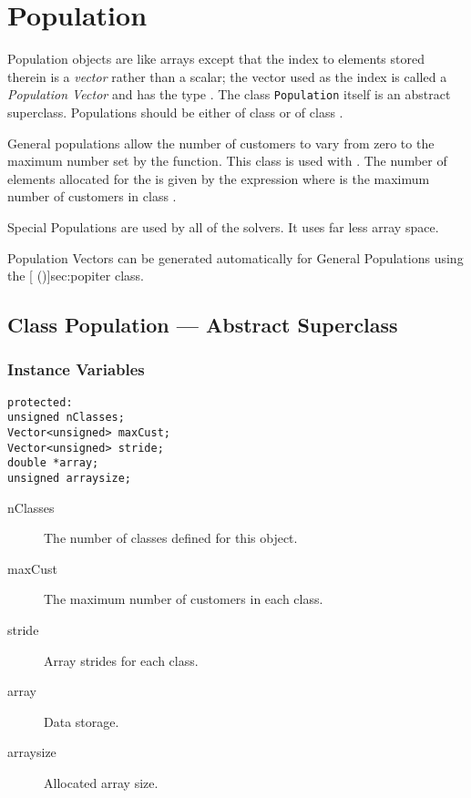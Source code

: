 % 
% 
\section{Population}
\label{sec:population}

Population objects are like arrays except that the index to elements
stored therein is a \emph{vector} rather than a scalar; the vector
used as the index is called a \emph{Population Vector} and has the
type .  The class \texttt{Population} itself is an
abstract superclass.  Populations should be either of class
 or of class
.

General populations allow the number of customers to vary from zero to
the maximum number set by the
 function.  This
class is used with .  The number of
elements allocated for the  is
given by the expression  where  is the maximum number of customers
in class .

Special Populations are used by all of the  solvers.  It uses far less array space.

Population Vectors can be generated automatically for General
Populations using the [
(\Sec\Ref)]{sec:popiter} class.

\subsection{Class Population --- Abstract Superclass}
\subsubsection{Instance Variables}
\label{sec:population-ivars}

\begin{verbatim}
protected:
unsigned nClasses;
Vector<unsigned> maxCust;
Vector<unsigned> stride;
double *array;
unsigned arraysize;
\end{verbatim}

\begin{description}
\item[nClasses] \texonly{---} The number of classes defined for this
   object.
\item[maxCust] \texonly{---} The maximum number of customers in each class.
\item[stride] \texonly{---} Array strides for each class.
\item[array] \texonly{---} Data storage.
\item[arraysize] \texonly{---} Allocated array size.
\end{description}


